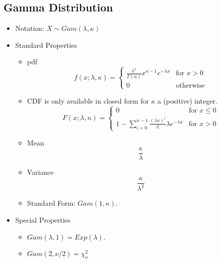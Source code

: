 \documentclass[12pt]{article} %
\begin{document}
\subsection{Gamma Distribution}
\begin{itemize}
\item Notation: $X\sim Gam(\lambda,\kappa)$

\item Standard Properties

\begin{minipage}{3.5in}
\begin{itemize}[label=$\star$]
\item pdf $$f(x;\lambda,\kappa) = \left\{\begin{matrix}
\frac{\lambda^\kappa}{\Gamma(\kappa)}x^{\kappa-1} e^{-\lambda x}& \textrm{for } x>0\\ 0&\textrm {otherwise}
\end{matrix}\right.$$
\item CDF is only available in closed form for $\kappa$ a (positive) integer.
 $$F(x;\lambda,n) = \left\{\begin{matrix}
0&\textrm{for } x\leq 0\\ 1-\sum_{i=0}^{n-1}\frac{\left(\lambda x\right)^i}{i!}\lambda e^{-\lambda x}& \textrm{for } x>0
\end{matrix}\right.$$
\end{itemize}
\end{minipage}
\hspace{1in}
\begin{minipage}{3in}
\begin{itemize}[label=$\star$]
\item Mean $$\frac\kappa\lambda$$
\item Variance $$\frac\kappa{\lambda^2}$$
\item Standard Form: $Gam(1,\kappa)$.
\end{itemize}
\end{minipage}
\item Special Properties
\begin{itemize}[label=$\star$]
\item $Gam(\lambda,1) = Exp(\lambda)$.
\item $Gam(2,\nu/2) = \chi^2_\nu$
\end{itemize}
\end{itemize}
\end{document}
